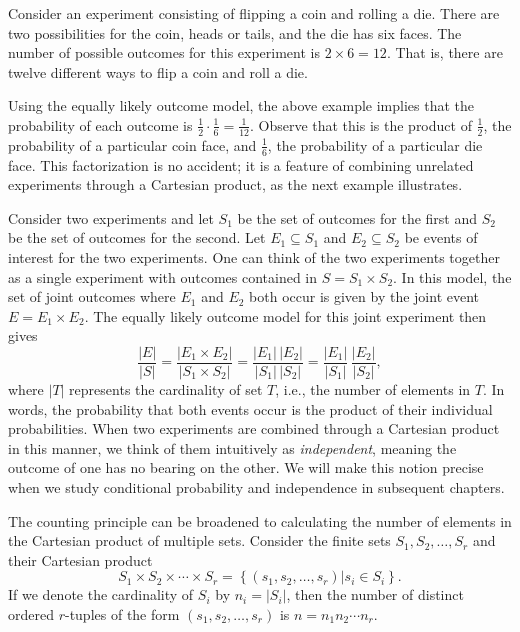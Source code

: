 \begin{example}
Consider an experiment consisting of flipping a coin and rolling a die.
There are two possibilities for the coin, heads or tails, and the die has six faces.
The number of possible outcomes for this experiment is $2 \times 6 = 12$.
That is, there are twelve different ways to flip a coin and roll a die.
\end{example}

Using the equally likely outcome model, the above example implies that the probability of each outcome is $\frac{1}{2} \cdot \frac{1}{6} = \frac{1}{12}$.
Observe that this is the product of $\frac{1}{2}$, the probability of a particular coin face, and $\frac{1}{6}$, the probability of a particular die face.
This factorization is no accident; it is a feature of combining unrelated experiments through a Cartesian product, as the next example illustrates.

\begin{example}
Consider two experiments and let $S_1$ be the set of outcomes for the first and $S_2$ be the set of outcomes for the second.
Let $E_1 \subseteq S_1$ and $E_2 \subseteq S_2$ be events of interest for the two experiments.
One can think of the two experiments together as a single experiment with outcomes contained in $S = S_1 \times S_2$.
In this model, the set of joint outcomes where $E_1$ and $E_2$ both occur is given by the joint event $E = E_1 \times E_2$.
The equally likely outcome model for this joint experiment then gives
\begin{equation*}
\frac{|E|}{|S|} = \frac{|E_1 \times E_2|}{|S_1 \times S_2|}
= \frac{|E_1|\,|E_2|}{|S_1|\,|S_2|}
= \frac{|E_1|}{|S_1|}\,\frac{|E_2|}{|S_2|},
\end{equation*}
where $|T|$ represents the cardinality of set $T$, i.e., the number of elements in $T$.
In words, the probability that both events occur is the product of their individual probabilities.
When two experiments are combined through a Cartesian product in this manner, we think of them intuitively as \emph{independent}, meaning the outcome of one has no bearing on the other.
We will make this notion precise when we study conditional probability and independence in subsequent chapters.
\end{example}

The counting principle can be broadened to calculating the number of elements in the Cartesian product of multiple sets.
Consider the finite sets $S_1, S_2, \ldots, S_r$ and their Cartesian product
\begin{equation*}
S_1 \times S_2 \times \cdots \times S_r
= \left\{ (s_1, s_2, \ldots, s_r) | s_i \in S_i \right\} .
\end{equation*}
If we denote the cardinality of $S_i$ by $n_i = | S_i |$, then the number of distinct ordered $r$-tuples of the form $(s_1, s_2, \ldots, s_r)$ is $n = n_1 n_2 \cdots n_r$.

